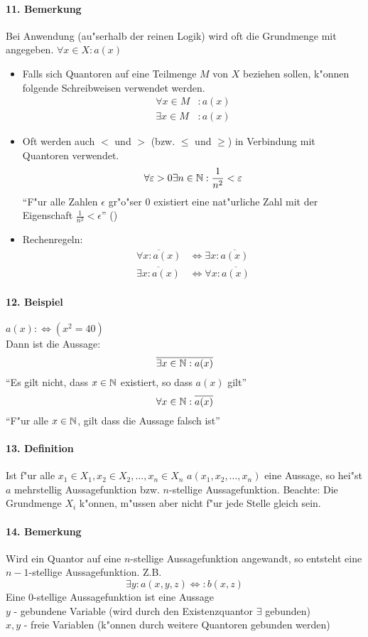 \paragraph{11. Bemerkung} Bei Anwendung (au"serhalb der reinen Logik) wird oft die Grundmenge mit angegeben. $\forall x\in X:a(x)$
\begin{itemize}
	\item Falls sich Quantoren auf eine Teilmenge $M$ von $X$ beziehen sollen, k"onnen folgende Schreibweisen verwendet werden.
	\begin{align*}
		\forall x\in M&:a(x)\\
		\exists x\in M&:a(x)
	\end{align*}
	\item Oft werden auch $<$ und $>$ (bzw. $\le$ und $\ge$) in Verbindung mit Quantoren verwendet.
	\[\forall\varepsilon>0\exists n\in\mathbb{N}:\frac{1}{n^2}<\varepsilon\]
	\enquote{F"ur alle Zahlen $\epsilon$ gr"o"ser $0$ existiert eine nat"urliche Zahl mit der Eigenschaft $\frac{1}{n^2}<\epsilon$} (\tgreen{\true})
	\item Rechenregeln:
	\begin{align*}
		\overline{\forall x:a(x)}&\Leftrightarrow\exists x:\overline{a(x)}\\
		\overline{\exists x:a(x)}&\Leftrightarrow\forall x:\overline{a(x)}
	\end{align*}
\end{itemize}

\paragraph{12. Beispiel} $a(x):\Leftrightarrow(x^2=40)$ \tred\false\\
Dann ist die Aussage:
\[\overline{\exists x\in\mathbb{N}:a(x)}\]
\enquote{Es gilt nicht, dass $x\in\mathbb{N}$ existiert, so dass $a(x)$ gilt}
\[\forall x\in\mathbb{N}:\overline{a(x)}\]
\enquote{F"ur alle $x\in\mathbb{N}$, gilt dass die Aussage falsch ist}

\paragraph{13. Definition} \parskp
Ist f"ur alle $x_1\in X_1,x_2\in X_2,\dots,x_n\in X_n$ $a(x_1,x_2,\dots,x_n)$ eine Aussage, so hei"st $a$ mehrstellig Aussagefunktion bzw. $n$-stellige Aussagefunktion. \newline
Beachte: Die Grundmenge $X_i$ k"onnen, m"ussen aber nicht f"ur jede Stelle gleich sein.

\paragraph{14. Bemerkung}
Wird ein Quantor auf eine $n$-stellige Aussagefunktion angewandt, so entsteht eine $n-1$-stellige Aussagefunktion. Z.B.
\[\exists y:a(x,y,z)\Leftrightarrow:b(x,z)\]
Eine $0$-stellige Aussagefunktion ist eine Aussage \\
\quad $y$ - gebundene Variable (wird durch den Existenzquantor $\exists$ gebunden)\\
\quad $x,y$ - freie Variablen (k"onnen durch weitere Quantoren gebunden werden)


